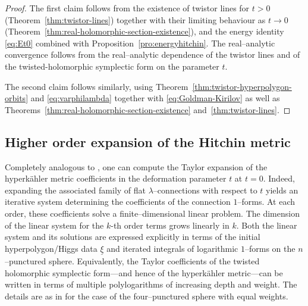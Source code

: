 \documentclass[12pt,a4paper]{amsart}
\theoremstyle{definition}
\theoremstyle{remark}
\begin{document}
\begin{proof}
The first claim follows from the existence of twistor lines for $t>0$
(Theorem~\ref{thm:twistor-lines}) together with their limiting behaviour as $t\to0$
(Theorem~\ref{thm:real-holomorphic-section-existence}), and the energy identity
\eqref{eq:Et0} combined with Proposition~\ref{pro:energyhitchin}.
The real--analytic convergence follows from the real--analytic dependence
of the twistor lines and of the twisted-holomorphic symplectic form on the parameter $t$.

The second claim follows similarly, using Theorem~\ref{thm:twistor-hyperpolygon-orbits}
and \eqref{eq:varphilambda} together with
\eqref{eq:Goldman-Kirilov} 
as well as Theorems~\ref{thm:real-holomorphic-section-existence}
and~\ref{thm:twistor-lines}.
\end{proof}

\subsection{Higher order expansion of the Hitchin metric}

Completely analogous to \cite{HellerHellerTraizet2025}, one can compute the Taylor expansion of the
hyperk\"ahler metric coefficients in the deformation parameter $t$ at $t=0.$ Indeed,
expanding the associated family of flat $\lambda$--connections with respect to $t$
yields an iterative system determining the coefficients of the connection $1$--forms.
At each order, these coefficients solve a finite--dimensional linear problem.
The dimension of the linear system for the $k$-th order terms grows linearly in $k$.
Both the linear system and its solutions are expressed explicitly in terms of the
initial hyperpolygon/Higgs data $\underline\xi$ and iterated integrals of  logarithmic
$1$--forms on the $n$--punctured sphere. Equivalently, the Taylor coefficients of the
twisted holomorphic symplectic form---and hence of the hyperk\"ahler metric---can be
written in terms of multiple polylogarithms of increasing depth and weight. The details
are as in \cite[Section~7]{HellerHellerTraizet2025} for
the case of the four--punctured sphere with equal weights.
\end{document}
